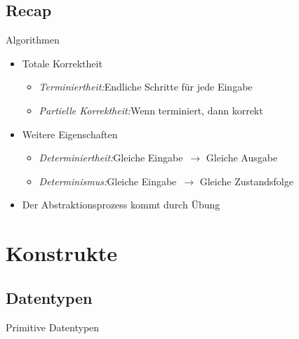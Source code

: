 {\subsection{Recap}
\begin{frame}[c]{\hfill Algorithmen}
\begin{itemize}[<+(1)->]
   \itemsep14pt
   \item Totale Korrektheit \begin{itemize}
      \item \textit{Terminiertheit:}\hfill Endliche Schritte für jede Eingabe
      \item \textit{Partielle Korrektheit:}\hfill Wenn terminiert, dann korrekt
   \end{itemize}
   \item Weitere Eigenschaften \begin{itemize}
      \item \textit{Determiniertheit:}\hfill Gleiche Eingabe~\(\to\) Gleiche Ausgabe
      \item \textit{Determinismus:}\hfill Gleiche Eingabe~\(\to\) Gleiche Zustandsfolge
   \end{itemize}
   \item Der Abstraktionsprozess kommt durch Übung
\end{itemize}
\LargeSide
\end{frame}


\section{Konstrukte}
\subsection{Datentypen}
\def\dt#1{{\large\bfseries\textcolor{paletteA!58!white}{\strut#1}}}
\begin{frame}[c]{Primitive Datentypen}
\centering\begin{layout-imageonly}
\end{layout-imageonly}
\end{frame}}
